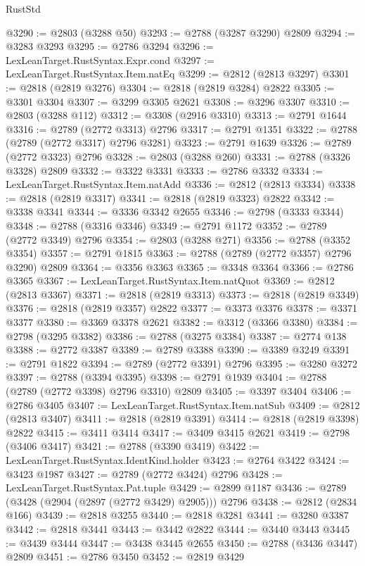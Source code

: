 \begin{lexlean}{RustStd}
\begin{coremodule}
@3290 := @2803 (@3288 @50)
@3293 := @2788 (@3287 @3290) @2809
@3294 := @3283 @3293
@3295 := @2786 @3294
@3296 := LexLeanTarget.RustSyntax.Expr.cond
@3297 := LexLeanTarget.RustSyntax.Item.natEq
@3299 := @2812 (@2813 @3297)
@3301 := @2818 (@2819 @3276)
@3304 := @2818 (@2819 @3284) @2822
@3305 := @3301 @3304
@3307 := @3299 @3305 @2621
@3308 := @3296 @3307
@3310 := @2803 (@3288 @112)
@3312 := @3308 (@2916 @3310)
@3313 := @2791 @1644
@3316 := @2789 (@2772 @3313) @2796
@3317 := @2791 @1351
@3322 := @2788 (@2789 (@2772 @3317) @2796 @3281)
@3323 := @2791 @1639
@3326 := @2789 (@2772 @3323) @2796
@3328 := @2803 (@3288 @260)
@3331 := @2788 (@3326 @3328) @2809
@3332 := @3322 @3331
@3333 := @2786 @3332
@3334 := LexLeanTarget.RustSyntax.Item.natAdd
@3336 := @2812 (@2813 @3334)
@3338 := @2818 (@2819 @3317)
@3341 := @2818 (@2819 @3323) @2822
@3342 := @3338 @3341
@3344 := @3336 @3342 @2655
@3346 := @2798 (@3333 @3344)
@3348 := @2788 (@3316 @3346)
@3349 := @2791 @1172
@3352 := @2789 (@2772 @3349) @2796
@3354 := @2803 (@3288 @271)
@3356 := @2788 (@3352 @3354)
@3357 := @2791 @1815
@3363 := @2788 (@2789 (@2772 @3357) @2796 @3290) @2809
@3364 := @3356 @3363
@3365 := @3348 @3364
@3366 := @2786 @3365
@3367 := LexLeanTarget.RustSyntax.Item.natQuot
@3369 := @2812 (@2813 @3367)
@3371 := @2818 (@2819 @3313)
@3373 := @2818 (@2819 @3349)
@3376 := @2818 (@2819 @3357) @2822
@3377 := @3373 @3376
@3378 := @3371 @3377
@3380 := @3369 @3378 @2621
@3382 := @3312 (@3366 @3380)
@3384 := @2798 (@3295 @3382)
@3386 := @2788 (@3275 @3384)
@3387 := @2774 @138
@3388 := @2772 @3387
@3389 := @2789 @3388
@3390 := @3389 @3249
@3391 := @2791 @1822
@3394 := @2789 (@2772 @3391) @2796
@3395 := @3280 @3272
@3397 := @2788 (@3394 @3395)
@3398 := @2791 @1939
@3404 := @2788 (@2789 (@2772 @3398) @2796 @3310) @2809
@3405 := @3397 @3404
@3406 := @2786 @3405
@3407 := LexLeanTarget.RustSyntax.Item.natSub
@3409 := @2812 (@2813 @3407)
@3411 := @2818 (@2819 @3391)
@3414 := @2818 (@2819 @3398) @2822
@3415 := @3411 @3414
@3417 := @3409 @3415 @2621
@3419 := @2798 (@3406 @3417)
@3421 := @2788 (@3390 @3419)
@3422 := LexLeanTarget.RustSyntax.IdentKind.holder
@3423 := @2764 @3422
@3424 := @3423 @1987
@3427 := @2789 (@2772 @3424) @2796
@3428 := LexLeanTarget.RustSyntax.Pat.tuple
@3429 := @2899 @1187
@3436 := @2789 (@3428 (@2904 (@2897 (@2772 @3429) @2905))) @2796
@3438 := @2812 (@2834 @166)
@3439 := @2818 @3255
@3440 := @2818 @3281
@3441 := @3280 @3387
@3442 := @2818 @3441
@3443 := @3442 @2822
@3444 := @3440 @3443
@3445 := @3439 @3444
@3447 := @3438 @3445 @2655
@3450 := @2788 (@3436 @3447) @2809
@3451 := @2786 @3450
@3452 := @2819 @3429

\end{coremodule}
\end{lexlean}
